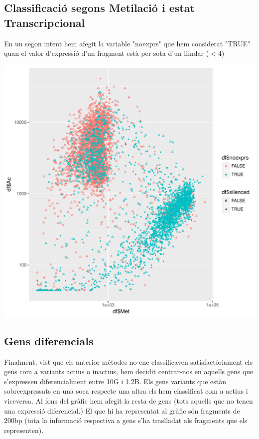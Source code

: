 \documentclass{article}\usepackage[]{graphicx}\usepackage[]{color}
\newenvironment{knitrout}{}{} %
\begin{document}
\subsection{Classificació segons Metilació i estat Transcripcional}
En un segon intent hem afegit la variable "noexprs" que hem considerat "TRUE" quan el valor d'expressió d'un fragment està per sota d'un llindar ($<$4)
\begin{knitrout}
\color{fgcolor}

{\centering \includegraphics[width=1\linewidth]{figure/minimal-ac_met_log-1} 

}



\end{knitrout}
\clearpage
\subsection{Gens diferencials}
Finalment, vist que els anterior mètodes no enc classificaven satisfactòriament els gens com a variants actius o inactius, hem decidit centrar-nos en aquells gens que s'expressen diferencialment entre 10G i 1.2B. 
Els gens variants que estàn sobreexpressats en una soca respecte una altra els hem classificat com a actius i viceversa.
Al fons del gràfic hem afegit la resta de gens (tots aquells que no tenen una expressió diferencial.)
El que hi ha representat al gràfic són fragments de 200bp (tota la informació respectiva a gens s'ha traslladat als fragments que els representen).
\clearpage
\end{document}
